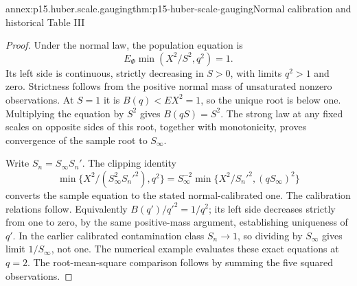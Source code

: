 \begin{annexitem}{annex:p15.huber.scale.gauging}{thm:p15-huber-scale-gauging}{Normal calibration and historical Table III}
\begin{proof}
Under the normal law, the population equation is
\[
 E_\Phi\min(X^2/S^2,q^2)=1.
\]
Its left side is continuous, strictly decreasing in \(S>0\),
with limits \(q^2>1\) and zero. Strictness follows from the
positive normal mass of unsaturated nonzero observations.
At \(S=1\) it is \(B(q)<EX^2=1\), so the unique root is below one.
Multiplying the equation by \(S^2\) gives \(B(qS)=S^2\).
The strong law at any fixed scales on opposite sides of this
root, together with monotonicity, proves convergence of the
sample root to \(S_\infty\).

Write \(S_n=S_\infty S_n'\). The clipping identity
\[
 \min\{X^2/(S_\infty^2S_n'^2),q^2\}
 =S_\infty^{-2}\min\{X^2/S_n'^2,(qS_\infty)^2\}
\]
converts the sample equation to the stated normal-calibrated one.
The calibration relations follow. Equivalently
\(B(q')/q'^2=1/q^2\); its left side decreases strictly from
one to zero, by the same positive-mass argument, establishing
uniqueness of \(q'\).
In the earlier calibrated contamination class \(S_n\to1\),
so dividing by \(S_\infty\) gives limit \(1/S_\infty\), not one.
The numerical example evaluates these exact equations at \(q=2\).
The root-mean-square comparison follows by summing the five
squared observations.
\end{proof}
\end{annexitem}

